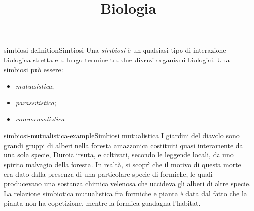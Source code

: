 \documentclass[preview]{standalone}
\begin{document}
\title{Biologia}
\genpage

\begin{snippetdefinition}{simbiosi-definition}{Simbiosi}
    Una \textit{simbiosi} è un qualsiasi tipo di interazione biologica stretta
    e a lungo termine tra due diversi organismi biologici.
    Una simbiosi può essere:
    \begin{itemize}
        \item \textit{mutualistica};
        \item \textit{parassitistica};
        \item \textit{commensalistica}.
    \end{itemize}
\end{snippetdefinition}

\begin{snippetexample}{simbiosi-mutualistica-example}{Simbiosi mutualistica}
    I giardini del diavolo sono grandi gruppi di alberi nella foresta amazzonica
    costituiti quasi interamente da una sola specie, Duroia
    irsuta, e coltivati, secondo le leggende locali, da uno spirito
    malvagio della foresta.
    In realtà, si scoprì che il motivo di questa morte era dato dalla presenza
    di una particolare specie di formiche, le quali producevano una sostanza
    chimica velenosa che uccideva gli alberi di altre specie.
    La relazione simbiotica mutualistica fra formiche e pianta è data dal fatto che
    la pianta non ha copetizione, mentre la formica guadagna l'habitat.  
\end{snippetexample}
\end{document}
